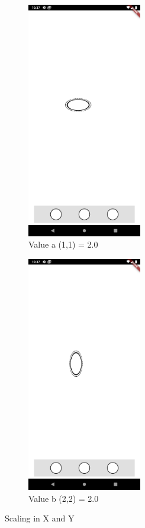 \begin{figure}[b]
    \begin{subfigure}{0.4\textwidth}
        \centering
        \includegraphics[width=5cm]{Images/App/xscale.png}
        \caption{Value a (1,1) = 2.0}
        \label{fig:xscale}
    \end{subfigure}
    \hfill
    \begin{subfigure}{0.4\textwidth}
        \centering
        \includegraphics[width=5cm]{Images/App/yscale.png}
        \caption{Value b (2,2) = 2.0}
        \label{fig:yscale}
    \end{subfigure}
    \caption{Scaling in X and Y}
    \label{fig:xysacle}
\end{figure}


